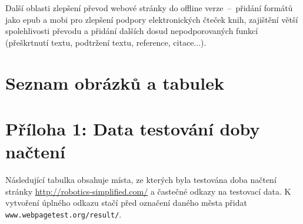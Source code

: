 \documentclass[a4paper, 12pt]{article}
\makeatletter
\renewcommand\listoffigures{%
    \@mkboth{\MakeUppercase\listfigurename}%
        {\MakeUppercase\listfigurename}%
    \@starttoc{lof}%
}
\renewcommand\listoftables{%
    \@mkboth{\MakeUppercase\listtablename}%
        {\MakeUppercase\listtablename}%
    \@starttoc{lot}%
}
\makeatother
\begin{document}
  Další oblasti zlepšení převod webové stránky do offline verze~--~přidání formátů jako \gls{epub} a \gls{mobi} pro zlepšení podpory elektronických čteček knih, zajištění větší spolehlivosti převodu a přidání dalších dosud nepodporovaných funkcí (přeškrtnutí textu, podtržení textu, reference, citace...).


  \newpage

  \printbibliography[heading=bibnumbered, title=Použitá literatura]

  \newpage

  \section{Seznam obrázků a tabulek}
  {%
  \let\oldnumberline\numberline%
  \renewcommand{\numberline}{\figurename~\oldnumberline}%
  \listoffigures%
  }
  \vspace{\baselineskip}
  {%
  \let\oldnumberline\numberline%
  \renewcommand{\numberline}{\tablename~\oldnumberline}%
  \listoftables%
  }

  \newpage

  \section{Příloha 1: Data testování doby načtení} \label{sec:Příloha 1: Data testování doby načtení}
  Následující tabulka obsahuje místa, ze kterých byla testována doba načtení stránky \url{http://robotics-simplified.com/} a častečné odkazy na testovací data. K vytvoření úplného odkazu stačí před označení daného města přidat \texttt{www.webpagetest.org/result/}.
\end{document}
